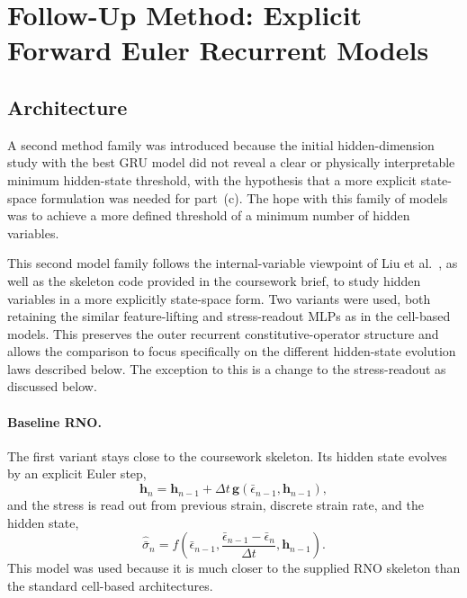 \documentclass[11pt,a4paper, onecolumn]{article}
\newcommand{\epsbar}{\bar{\epsilon}}
\newcommand{\sigbar}{\bar{\sigma}}
\newcommand{\dt}{\Delta t}
\begin{document}
\FloatBarrier

\section{Follow-Up Method: Explicit Forward Euler Recurrent Models}

\subsection{Architecture}

A second method family was introduced because the initial hidden-dimension study with the best GRU model did not reveal a clear or physically interpretable minimum hidden-state threshold, with the hypothesis that a more explicit state-space formulation was needed for part~(c). The hope with this family of models was to achieve a more defined threshold of a minimum number of hidden variables.

This second model family follows the internal-variable viewpoint of Liu et al.~\cite{Liu_2023}, as well as the skeleton code provided in the coursework brief, to study hidden variables in a more explicitly state-space form. Two variants were used, both retaining the similar feature-lifting and stress-readout MLPs as in the cell-based models. This preserves the outer recurrent constitutive-operator structure and allows the comparison to focus specifically on the different hidden-state evolution laws described below. The exception to this is a change to the stress-readout as discussed below.


\paragraph{Baseline RNO.}
The first variant stays close to the coursework skeleton. Its hidden state evolves by an explicit Euler step,
\begin{equation}
\bm{h}_n=\bm{h}_{n-1}+\dt\,\bm{g}\!\left(\epsbar_{n-1},\bm{h}_{n-1}\right),
\label{eq:baseline_state_update}
\end{equation}
and the stress is read out from previous strain, discrete strain rate, and the hidden state,
\begin{equation}
\hat{\sigbar}_n=f\!\left(\epsbar_{n-1},\frac{\epsbar_{n-1}-\epsbar_n}{\dt},\bm{h}_{n-1}\right).
\label{eq:baseline_readout}
\end{equation}
This model was used because it is much closer to the supplied RNO skeleton than the standard cell-based architectures.
\end{document}
